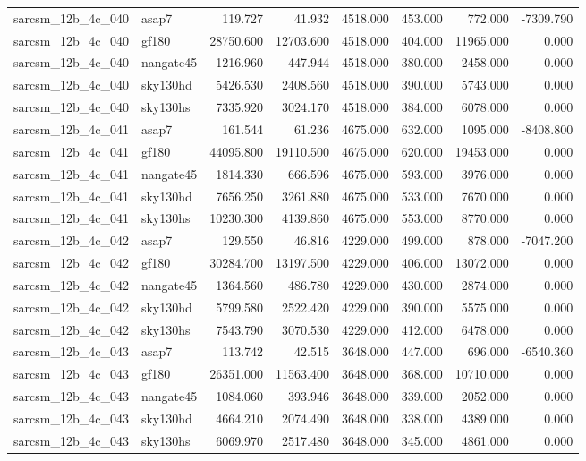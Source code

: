 \begin{tabular}{llrrrrrr}
sarcsm\_12b\_4c\_040 & asap7 & 119.727 & 41.932 & 4518.000 & 453.000 & 772.000 & -7309.790 \\
sarcsm\_12b\_4c\_040 & gf180 & 28750.600 & 12703.600 & 4518.000 & 404.000 & 11965.000 & 0.000 \\
sarcsm\_12b\_4c\_040 & nangate45 & 1216.960 & 447.944 & 4518.000 & 380.000 & 2458.000 & 0.000 \\
sarcsm\_12b\_4c\_040 & sky130hd & 5426.530 & 2408.560 & 4518.000 & 390.000 & 5743.000 & 0.000 \\
sarcsm\_12b\_4c\_040 & sky130hs & 7335.920 & 3024.170 & 4518.000 & 384.000 & 6078.000 & 0.000 \\
sarcsm\_12b\_4c\_041 & asap7 & 161.544 & 61.236 & 4675.000 & 632.000 & 1095.000 & -8408.800 \\
sarcsm\_12b\_4c\_041 & gf180 & 44095.800 & 19110.500 & 4675.000 & 620.000 & 19453.000 & 0.000 \\
sarcsm\_12b\_4c\_041 & nangate45 & 1814.330 & 666.596 & 4675.000 & 593.000 & 3976.000 & 0.000 \\
sarcsm\_12b\_4c\_041 & sky130hd & 7656.250 & 3261.880 & 4675.000 & 533.000 & 7670.000 & 0.000 \\
sarcsm\_12b\_4c\_041 & sky130hs & 10230.300 & 4139.860 & 4675.000 & 553.000 & 8770.000 & 0.000 \\
sarcsm\_12b\_4c\_042 & asap7 & 129.550 & 46.816 & 4229.000 & 499.000 & 878.000 & -7047.200 \\
sarcsm\_12b\_4c\_042 & gf180 & 30284.700 & 13197.500 & 4229.000 & 406.000 & 13072.000 & 0.000 \\
sarcsm\_12b\_4c\_042 & nangate45 & 1364.560 & 486.780 & 4229.000 & 430.000 & 2874.000 & 0.000 \\
sarcsm\_12b\_4c\_042 & sky130hd & 5799.580 & 2522.420 & 4229.000 & 390.000 & 5575.000 & 0.000 \\
sarcsm\_12b\_4c\_042 & sky130hs & 7543.790 & 3070.530 & 4229.000 & 412.000 & 6478.000 & 0.000 \\
sarcsm\_12b\_4c\_043 & asap7 & 113.742 & 42.515 & 3648.000 & 447.000 & 696.000 & -6540.360 \\
sarcsm\_12b\_4c\_043 & gf180 & 26351.000 & 11563.400 & 3648.000 & 368.000 & 10710.000 & 0.000 \\
sarcsm\_12b\_4c\_043 & nangate45 & 1084.060 & 393.946 & 3648.000 & 339.000 & 2052.000 & 0.000 \\
sarcsm\_12b\_4c\_043 & sky130hd & 4664.210 & 2074.490 & 3648.000 & 338.000 & 4389.000 & 0.000 \\
sarcsm\_12b\_4c\_043 & sky130hs & 6069.970 & 2517.480 & 3648.000 & 345.000 & 4861.000 & 0.000 \\

\end{tabular}
